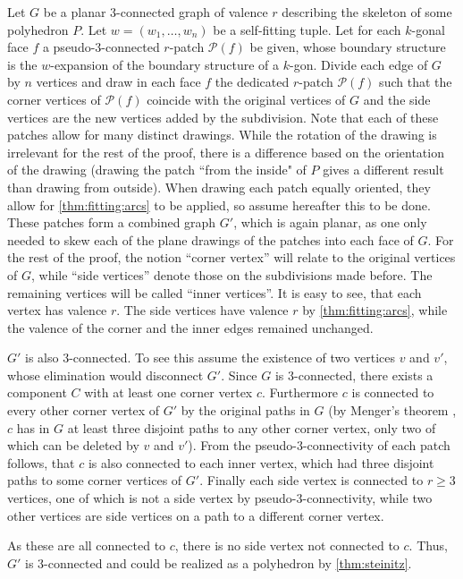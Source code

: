 \begin{construction}\label{thm:construction:patch}
  Let $G$ be a planar $3$-connected graph of valence $r$ describing the skeleton of some polyhedron $P$. Let $w = (w_1, \dots, w_n)$ be a self-fitting tuple. Let for each $k$-gonal face $f$ a pseudo-$3$-connected $r$-patch $\mathcal{P}(f)$ be given, whose boundary structure is the $w$-expansion of the boundary structure of a $k$-gon. Divide each edge of $G$ by $n$ vertices and draw in each face $f$ the dedicated $r$-patch $\mathcal{P}(f)$ such that the corner vertices of $\mathcal{P}(f)$ coincide with the original vertices of $G$ and the side vertices are the new vertices added by the subdivision. Note that each of these patches allow for many distinct drawings. While the rotation of the drawing is irrelevant for the rest of the proof, there is a difference based on the orientation of the drawing (drawing the patch ``from the inside" of $P$ gives a different result than drawing from outside). When drawing each patch equally oriented, they allow for \autoref{thm:fitting:arcs} to be applied, so assume hereafter this to be done. These patches form a combined graph $G'$, which is again planar, as one only needed to skew each of the plane drawings of the patches into each face of $G$. For the rest of the proof, the notion ``corner vertex'' will relate to the original vertices of $G$, while ``side vertices'' denote those on the subdivisions made before. The remaining vertices will be called ``inner vertices''. It is easy to see, that each vertex has valence $r$. The side vertices have valence $r$ by \autoref{thm:fitting:arcs}, while the valence of the corner and the inner edges remained unchanged.

$G'$ is also $3$-connected. To see this assume the existence of two vertices $v$ and $v'$, whose elimination would disconnect $G'$. Since $G$ is $3$-connected, there exists a component $C$ with at least one corner vertex $c$. Furthermore $c$ is connected to every other corner vertex of $G'$ by the original paths in $G$ (by Menger's theorem \cite{menger}, $c$ has in $G$ at least three disjoint paths to any other corner vertex, only two of which can be deleted by $v$ and $v'$). From the pseudo-$3$-connectivity of each patch follows, that $c$ is also connected to each inner vertex, which had three disjoint paths to some corner vertices of $G'$. Finally each side vertex is connected to $r \geq 3$ vertices, one of which is not a side vertex by pseudo-$3$-connectivity, while two other vertices are side vertices on a path to a different corner vertex. 

As these are all connected to $c$, there is no side vertex not connected to $c$. Thus, $G'$ is $3$-connected and could be realized as a polyhedron by \autoref{thm:steinitz}.
\end{construction}

